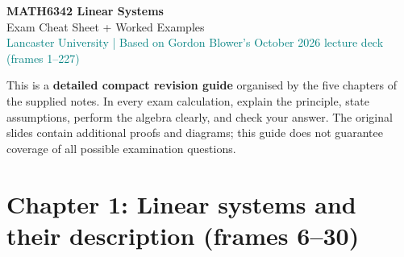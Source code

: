 \documentclass[10pt,a4paper]{article}
\begin{document}
\begin{center}{\Huge\bfseries\color{navy}MATH6342 Linear Systems}\\[3pt]{\Large Exam Cheat Sheet + Worked Examples}\\[5pt]
\textcolor{teal}{Lancaster University | Based on Gordon Blower's October 2026 lecture deck (frames 1--227)}\end{center}
\begin{defbox}[title={HOW TO USE THIS GUIDE}]This is a \textbf{detailed compact revision guide} organised by the five chapters of the supplied notes. In every exam calculation, explain the principle, state assumptions, perform the algebra clearly, and check your answer. The original slides contain additional proofs and diagrams; this guide does not guarantee coverage of all possible examination questions.\end{defbox}
\tableofcontents\newpage
\section{Chapter 1: Linear systems and their description (frames 6--30)}
\end{document}
